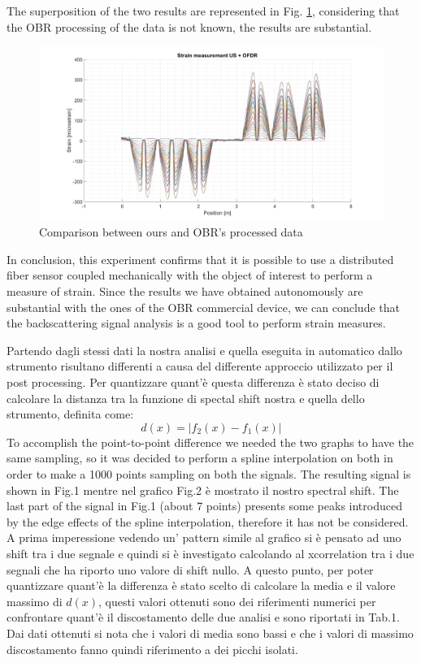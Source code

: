 The superposition of the two results are represented in Fig. \ref{fig:sovrapposizione}, considering that the OBR processing of the data is not known, the results are substantial.

\begin{figure}[H]
	\centering
	\includegraphics[scale=0.3]{img/sovrapposizione.png}
	\caption{Comparison between ours and OBR's processed data }\label{fig:sovrapposizione}
\end{figure}

In conclusion, this experiment confirms that it is possible to use a distributed fiber sensor coupled mechanically with the object of interest to perform a measure of strain. Since the results we have obtained autonomously are substantial with the ones of the OBR commercial device, we can conclude that the backscattering signal analysis is a good tool to perform strain measures.




Partendo dagli stessi dati la nostra analisi e quella eseguita in automatico dallo strumento risultano differenti a causa del differente approccio utilizzato per il post processing.
Per quantizzare quant'è questa differenza è stato deciso di calcolare la distanza tra la funzione di spectal shift nostra e quella dello strumento, definita come:
$$d(x) = |f_2(x) - f_1(x)|$$
To accomplish the point-to-point difference we needed the two graphs to have the same sampling, so it was decided to perform a spline interpolation on both in order to make a 1000 points sampling on both the signals. The resulting signal is shown in Fig.1 mentre nel grafico Fig.2 è mostrato il nostro spectral shift. The last part of the signal in Fig.1 (about 7 points) presents some peaks introduced by the edge effects of the spline interpolation, therefore it has not be considered.
A prima imperessione vedendo un' pattern simile al grafico si è pensato ad uno shift tra i due segnale e quindi si è investigato calcolando al xcorrelation tra i due segnali che ha riporto uno valore di shift nullo. A questo punto, per poter quantizzare quant'è la differenza è stato scelto di calcolare la media e il valore massimo di $d(x)$, questi valori ottenuti sono dei riferimenti numerici per confrontare quant'è il discostamento delle due analisi e sono riportati in Tab.1. Dai dati ottenuti si nota che i valori di media sono bassi e che i valori di massimo discostamento fanno quindi riferimento a dei picchi isolati.

